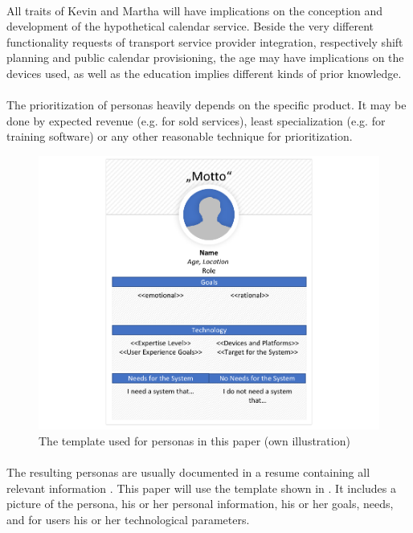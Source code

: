 \paragraph{} All traits of Kevin and Martha will have implications on the conception and development of the hypothetical calendar service. Beside the very different functionality requests of transport service provider integration, respectively shift planning and public calendar provisioning, the age may have implications on the devices used, as well as the education implies different kinds of prior knowledge. 

\paragraph{} The prioritization of personas heavily depends on the specific product. It may be done by expected revenue (e.g. for sold services), least specialization (e.g. for training software) or any other reasonable technique for prioritization.

\begin{figure}[H]
    \centering
    \includegraphics[width=\textwidth]{img/PersonaTemplate.pdf}
    \caption[Template for Personas]{The template used for personas in this paper (own illustration)}
    \label{fig:persTemp}
\end{figure}

\paragraph{} The resulting personas are usually documented in a resume containing all relevant information \parencites[cf.][40]{Robier.2016}[cf.][]{Platt.2016}. This paper will use the template shown in . It includes a picture of the persona, his or her personal information, his or her goals, needs, and for users his or her technological parameters.


